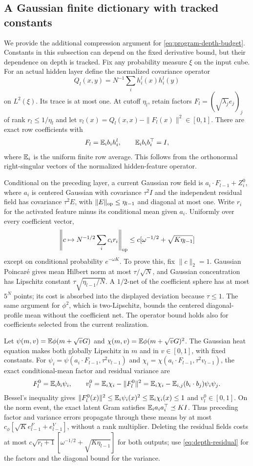 \subsection{A Gaussian finite dictionary with tracked constants}
We provide the additional compression argument for \eqref{eq:program-depth-budget}. Constants in this subsection can depend on the fixed derivative bound, but their dependence on depth is tracked.
Fix any probability measure $\xi$ on the input cube. For an actual hidden layer define the normalized covariance operator
\[
 Q_l(x,y)=N^{-1}\sum_i h_i^l(x)h_i^l(y)
\]
on $L^2(\xi)$. Its trace is at most one. At cutoff $\eta_l$, retain factors $F_l=(\sqrt{\lambda_j}e_j)_j$ of rank $r_l\le1/\eta_l$ and let
$v_l(x)=Q_l(x,x)-\|F_l(x)\|^2\in[0,1]$.
There are exact row coefficients with
\[
 F_l=\mathbb E_i b_i h_i^l,\qquad \mathbb E_i b_i b_i^\top=I,
\]
where $\mathbb E_i$ is the uniform finite row average. This follows from the orthonormal right-singular vectors of the normalized hidden-feature operator.

Conditional on the preceding layer, a current Gaussian row field is
$a_i\cdot F_{l-1}+Z_i^0$, where $a_i$ is centered Gaussian with covariance $\tau^2I$ and the independent residual field has covariance $\tau^2E$, with $\|E\|_{\mathrm{op}}\le\eta_{l-1}$ and diagonal at most one. Write $r_i$ for the activated feature minus its conditional mean given $a_i$. Uniformly over every coefficient vector,
\begin{equation}
 \left\|c\mapsto N^{-1/2}\sum_i c_i r_i\right\|_{\mathrm{op}}
 \le c[\omega^{-1/2}+\sqrt{K\eta_{l-1}}]
 \label{eq:depth-residual}
\end{equation}
except on conditional probability $e^{-\omega K}$. To prove this, fix $\|c\|_2=1$. Gaussian Poincar\'e gives mean Hilbert norm at most $\tau/\sqrt N$, and Gaussian concentration has Lipschitz constant $\tau\sqrt{\eta_{l-1}/N}$. A $1/2$-net of the coefficient sphere has at most $5^N$ points; its cost is absorbed into the displayed deviation because $\tau\le1$. The same argument for $\phi^2$, which is two-Lipschitz, bounds the centered diagonal-profile mean without the coefficient net. The operator bound holds also for coefficients selected from the current realization.

Let $\psi(m,v)=\mathbb E\phi(m+\sqrt vG)$ and $\chi(m,v)=\mathbb E\phi(m+\sqrt vG)^2$. The Gaussian heat equation makes both globally Lipschitz in $m$ and in $v\in[0,1]$, with fixed constants. For $\psi_i=\psi(a_i\cdot F_{l-1},\tau^2v_{l-1})$ and $\chi_i=\chi(a_i\cdot F_{l-1},\tau^2v_{l-1})$, the exact conditional-mean factor and residual variance are
\[
 F_l^0=\mathbb E_i b_i\psi_i,\qquad
 v_l^0=\mathbb E_i\chi_i-\|F_l^0\|^2
      =\mathbb E_i\chi_i-\mathbb E_{i,j}(b_i\cdot b_j)\psi_i\psi_j.
\]
Bessel's inequality gives $\|F_l^0(x)\|^2\le\mathbb E_i\psi_i(x)^2\le\mathbb E_i\chi_i(x)\le1$ and $v_l^0\in[0,1]$. On the norm event, the exact latent Gram satisfies $\mathbb E_i a_i a_i^\top\preceq KI$. Thus preceding factor and variance errors propagate through these means by at most
$c_\phi[\sqrt K e_{l-1}^F+e_{l-1}^V]$, without a rank multiplier. Deleting the residual fields costs at most
$c\sqrt{r_l+1}[\omega^{-1/2}+\sqrt{K\eta_{l-1}}]$ for both outputs; use \eqref{eq:depth-residual} for the factors and the diagonal bound for the variance.

